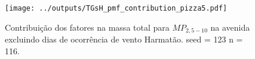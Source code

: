\begin{landscape}
  \begin{figure}
    \centering
    \begin{minipage}[b]{0.45\linewidth}
      \texttt{[image: ../outputs/TGsH\_pmf\_contribution\_pizza5.pdf]}
      \caption{Contribuição dos fatores na massa total para $MP_{2,5-10}$ na avenida
               excluindo dias de ocorrência de vento Harmatão. seed = 123 n = 116.
               \label{fig:TGsH_contribution5}}
    \end{minipage}%
    \hspace{0.5cm}
    \begin{minipage}[b]{0.45\linewidth}
      
    \end{minipage}
  \end{figure}
\end{landscape}



